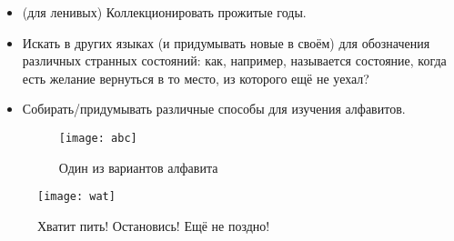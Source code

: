\begin{itemize}
    \item (для ленивых) Коллекционировать прожитые годы.
    \item Искать в других языках (и придумывать новые в своём) для обозначения различных странных состояний: как, например, называется состояние, когда есть желание вернуться в то место, из которого ещё не уехал?
    \item Собирать/придумывать различные способы для изучения алфавитов.
    \begin{figure}[ht!]
        \centering
        \texttt{[image: abc]}
        \caption{Один из вариантов алфавита}
    \end{figure}
\end{itemize}
\begin{figure}[ht!]
    \centering
    \texttt{[image: wat]}
    \caption{Хватит пить! Остановись! Ещё не поздно!}
\end{figure}
